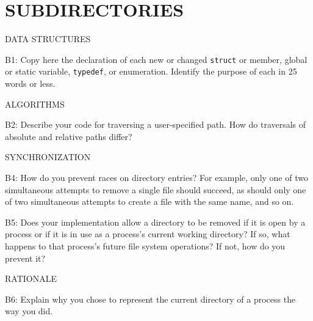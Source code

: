 \section*{SUBDIRECTORIES}

\begin{aspect}{DATA STRUCTURES}
	\begin{qc}
		B1: Copy here the declaration of each new or changed \lstinline{struct} or member,
		global or static variable, \lstinline{typedef}, or enumeration.
		Identify the purpose of each in 25 words or less.
	\end{qc}
\end{aspect}

\begin{aspect}{ALGORITHMS}
	\begin{qc}
		B2: Describe your code for traversing a user-specified path.  How
		do traversals of absolute and relative paths differ?
	\end{qc}
\end{aspect}

\begin{aspect}{SYNCHRONIZATION}
	\begin{qc}
		B4: How do you prevent races on directory entries?  For example,
		only one of two simultaneous attempts to remove a single file
		should succeed, as should only one of two simultaneous attempts to
		create a file with the same name, and so on.
	\end{qc}
	\begin{qc}
		B5: Does your implementation allow a directory to be removed if it
		is open by a process or if it is in use as a process's current
		working directory?  If so, what happens to that process's future
		file system operations?  If not, how do you prevent it?
	\end{qc}
\end{aspect}


\begin{aspect}{RATIONALE}
	\begin{qc}
		B6: Explain why you chose to represent the current directory of a
		process the way you did.
	\end{qc}
\end{aspect}

